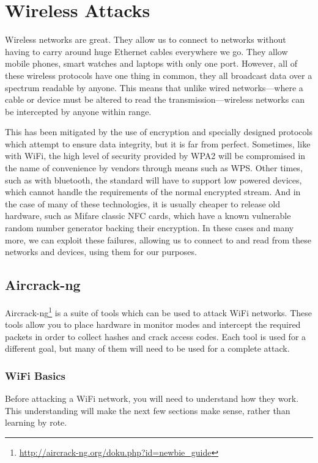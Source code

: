 \chapter{Wireless Attacks}
	\label{ch:WirelessAttacks}
	Wireless networks are great.
	They allow us to connect to networks without having to carry around huge Ethernet cables everywhere we go.
	They allow mobile phones, smart watches and laptops with only one port.
	However, all of these wireless protocols have one thing in common, they all broadcast data over a spectrum readable by anyone.
	This means that unlike wired networks---where a cable or device must be altered to read the transmission---wireless networks can be intercepted by anyone within range.

	This has been mitigated by the use of encryption and specially designed protocols which attempt to ensure data integrity, but it is far from perfect.
	Sometimes, like with WiFi, the high level of security provided by WPA2 will be compromised in the name of convenience by vendors through means such as WPS.
	Other times, such as with bluetooth, the standard will have to support low powered devices, which cannot handle the requirements of the normal encrypted stream.
	And in the case of many of these technologies, it is usually cheaper to release old hardware, such as Mifare classic NFC cards, which have a known vulnerable random number generator backing their encryption.
	In these cases and many more, we can exploit these failures, allowing us to connect to and read from these networks and devices, using them for our purposes.
	\section{Aircrack-ng}
		Aircrack-ng\footnote{\url{http://aircrack-ng.org/doku.php?id=newbie\_guide}} is a suite of tools which can be used to attack WiFi networks.
		These tools allow you to place hardware in monitor modes and intercept the required packets in order to collect hashes and crack access codes.
		Each tool is used for a different goal, but many of them will need to be used for a complete attack.
		\subsection{WiFi Basics}
			Before attacking a WiFi network, you will need to understand how they work.
			This understanding will make the next few sections make sense, rather than learning by rote.

